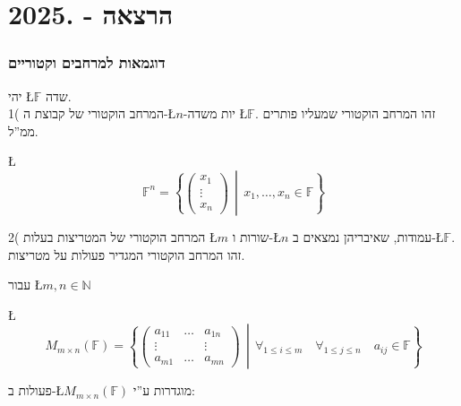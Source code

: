 \documentclass[english,hebrew]{article}
\begin{document}
\newpage{}

\noindent{}

\part{הרצאה {\endL} - {.2025\endL}}

\section{דוגמאות למרחבים וקטוריים}

יהי \L{$\mathbb{F}$} שדה.\\

1( המרחב הוקטורי של קבוצת ה-\L{$n$}-יות משדה \L{$\mathbb{F}$}. זהו
המרחב הוקטורי שמעליו פותרים ממ\textquotedblright ל.

\L{%
\[
\mathbb{F}^{n}=\left\{ \begin{pmatrix}x_{1}\\
\vdots\\
x_{n}
\end{pmatrix}\,\middle|\,x_{1},\dots,x_{n}\in\mathbb{F}\right\} 
\]
}%

2( המרחב הוקטורי של המטריצות בעלות \L{$m$} שורות ו-\L{$n$} עמודות,
שאיבריהן נמצאים ב-\L{$\mathbb{F}$}. זהו המרחב הוקטורי המגדיר פעולות
על מטריצות.

עבור \L{$m,n\in\mathbb{N}$}

\L{%
\[
M_{m\times n}(\mathbb{F})=\left\{ \begin{pmatrix}a_{11} & \dots & a_{1n}\\
\vdots &  & \vdots\\
a_{m1} & \dots & a_{mn}
\end{pmatrix}\,\middle|\,\forall_{1\le i\le m}\quad\forall_{1\le j\le n}\quad a_{ij}\in\mathbb{F}\right\} 
\]
}%

פעולות ב-\L{$M_{m\times n}(\mathbb{F})$} מוגדרות ע\textquotedblright י:
\end{document}
